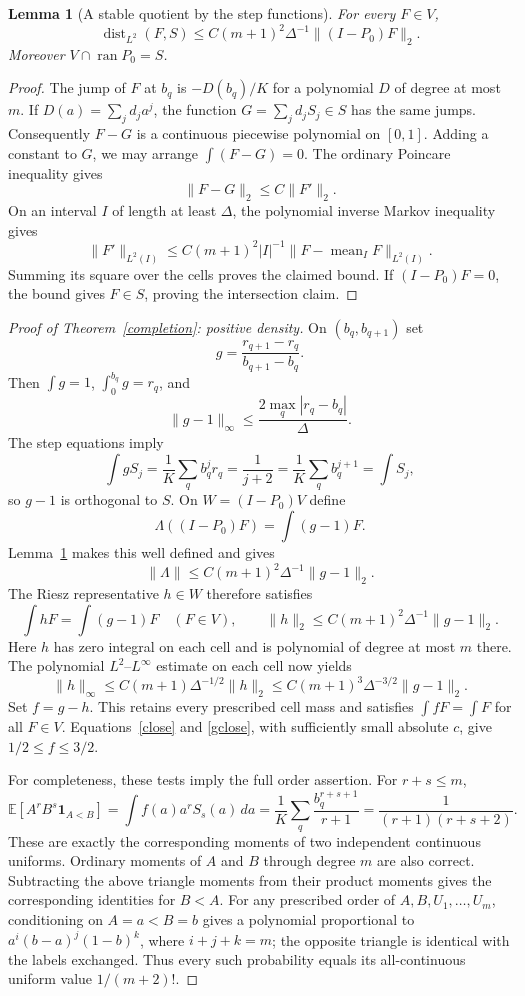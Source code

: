 \documentclass[11pt]{article}
\newtheorem{lemma}{Lemma}
\newcommand{\E}{\mathbb E}
\begin{document}
\begin{lemma}[A stable quotient by the step functions]\label{quotient}
For every $F\in V$,
\[
 \operatorname{dist}_{L^2}(F,S)
 \le C(m+1)^2\Delta^{-1}\|(I-P_0)F\|_2.
\]
Moreover $V\cap\operatorname{ran}P_0=S$.
\end{lemma}
\begin{proof}
The jump of $F$ at $b_q$ is $-D(b_q)/K$ for a polynomial $D$ of degree
at most $m$. If $D(a)=\sum_jd_ja^j$, the function
$G=\sum_jd_jS_j\in S$ has the same jumps. Consequently $F-G$ is a
continuous piecewise polynomial on $[0,1]$. Adding a constant to $G$,
we may arrange $\int(F-G)=0$. The ordinary Poincare inequality gives
\[
 \|F-G\|_2\le C\|F'\|_2.
\]
On an interval $I$ of length at least $\Delta$, the polynomial inverse
Markov inequality gives
\[
 \|F'\|_{L^2(I)}
 \le C(m+1)^2|I|^{-1}
       \|F-\operatorname{mean}_I F\|_{L^2(I)}.
\]
Summing its square over the cells proves the claimed bound. If
$(I-P_0)F=0$, the bound gives $F\in S$, proving the intersection claim.
\end{proof}

\begin{proof}[Proof of Theorem~\ref{completion}: positive density]
On $(b_q,b_{q+1})$ set
\[
 g=\frac{r_{q+1}-r_q}{b_{q+1}-b_q}.
\]
Then $\int g=1$, $\int_0^{b_q}g=r_q$, and
\begin{equation}\label{gclose}
 \|g-1\|_\infty\le\frac{2\max_q|r_q-b_q|}{\Delta}.
\end{equation}
The step equations imply
\[
 \int gS_j=\frac1K\sum_q b_q^j r_q=\frac1{j+2}
 =\frac1K\sum_q b_q^{j+1}=\int S_j,
\]
so $g-1$ is orthogonal to $S$. On $W=(I-P_0)V$ define
\[
 \Lambda((I-P_0)F)=\int(g-1)F.
\]
Lemma~\ref{quotient} makes this well defined and gives
\[
 \|\Lambda\|\le C(m+1)^2\Delta^{-1}\|g-1\|_2.
\]
The Riesz representative $h\in W$ therefore satisfies
\[
 \int hF=\int(g-1)F\quad(F\in V),\qquad
 \|h\|_2\le C(m+1)^2\Delta^{-1}\|g-1\|_2.
\]
Here $h$ has zero integral on each cell and is polynomial of degree at
most $m$ there. The polynomial $L^2$--$L^\infty$ estimate on each cell
now yields
\[
 \|h\|_\infty\le C(m+1)\Delta^{-1/2}\|h\|_2
 \le C(m+1)^3\Delta^{-3/2}\|g-1\|_2.
\]
Set $f=g-h$. This retains every prescribed cell mass and satisfies
$\int fF=\int F$ for all $F\in V$. Equations~\eqref{close} and
\eqref{gclose}, with sufficiently small absolute $c$, give
$1/2\le f\le3/2$.

For completeness, these tests imply the full order assertion. For
$r+s\le m$,
\[
 \E[A^rB^s\mathbf1_{A<B}]
 =\int f(a)a^rS_s(a)\,da
 =\frac1K\sum_q\frac{b_q^{r+s+1}}{r+1}
 =\frac1{(r+1)(r+s+2)}.
\]
These are exactly the corresponding moments of two independent
continuous uniforms. Ordinary moments of $A$ and $B$ through degree $m$
are also correct. Subtracting the above triangle moments from their
product moments gives the corresponding identities for $B<A$.
For any prescribed order of $A,B,U_1,\ldots,U_m$, conditioning on
$A=a<B=b$ gives a polynomial proportional to
$a^i(b-a)^j(1-b)^k$, where $i+j+k=m$; the opposite triangle is identical
with the labels exchanged. Thus every such probability equals its
all-continuous uniform value $1/(m+2)!$.
\end{proof}
\end{document}
